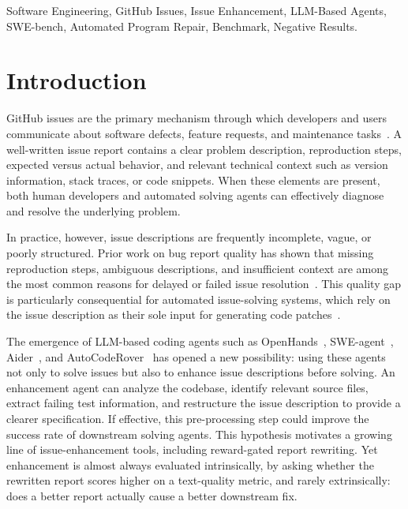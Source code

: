 \documentclass[journal]{IEEEtran}
\begin{document}
\begin{abstract}
amounts a resample of the solver predicts. We release the benchmark, the evaluation pipeline, and all experimental artifacts.
\end{abstract}

\begin{IEEEkeywords}
Software Engineering, GitHub Issues, Issue Enhancement, LLM-Based Agents, SWE-bench, Automated Program Repair, Benchmark, Negative Results.
\end{IEEEkeywords}

\section{Introduction}
\label{sec:introduction}

GitHub issues are the primary mechanism through which developers and users communicate about software defects, feature requests, and maintenance tasks~\cite{zhang2025swebenchlive, jimenez2024swebench}. A well-written issue report contains a clear problem description, reproduction steps, expected versus actual behavior, and relevant technical context such as version information, stack traces, or code snippets. When these elements are present, both human developers and automated solving agents can effectively diagnose and resolve the underlying problem.

In practice, however, issue descriptions are frequently incomplete, vague, or poorly structured. Prior work on bug report quality has shown that missing reproduction steps, ambiguous descriptions, and insufficient context are among the most common reasons for delayed or failed issue resolution~\cite{bettenburg2008what, zimmermann2010what}. This quality gap is particularly consequential for automated issue-solving systems, which rely on the issue description as their sole input for generating code patches~\cite{jimenez2024swebench, yang2024swe}.

The emergence of LLM-based coding agents such as OpenHands~\cite{wang2024openhands}, SWE-agent~\cite{yang2024swe}, Aider~\cite{aider2024}, and AutoCodeRover~\cite{zhang2024autocoderover} has opened a new possibility: using these agents not only to solve issues but also to enhance issue descriptions before solving. An enhancement agent can analyze the codebase, identify relevant source files, extract failing test information, and restructure the issue description to provide a clearer specification. If effective, this pre-processing step could improve the success rate of downstream solving agents. This hypothesis motivates a growing line of issue-enhancement tools, including reward-gated report rewriting. Yet enhancement is almost always evaluated intrinsically, by asking whether the rewritten report scores higher on a text-quality metric, and rarely extrinsically: does a better report actually cause a better downstream fix.
\end{document}
